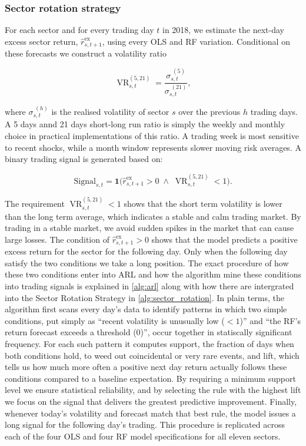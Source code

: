 \subsubsection{Sector rotation strategy}

For each sector and for every trading day $t$ in 2018, we estimate the next-day excess sector return, $\widehat{r}^{\text{ex}}_{s,t+1}$, using every OLS and RF variation. Conditional on these forecasts we construct a volatility ratio

\begin{equation}
\operatorname{VR}_{s,t}^{(5,21)}=\frac{\sigma_{s,t}^{\;(5)}}{\sigma_{s,t}^{\;(21)}},
\end{equation}

where $\sigma_{s,t}^{\;(h)}$ is the realised volatility of sector $s$ over the previous $h$ trading days. A 5 days annd 21 days short-long run ratio is simply the weekly and monthly choice in practical implementations of this ratio. A trading week is most sensitive to recent shocks, while a month window represents slower moving risk averages. A binary trading signal is generated based on:

\begin{equation}
\text{Signal}_{s,t}=\mathbf{1}
\!\bigl(
\widehat{r}^{\text{ex}}_{s,t+1}>0
\;\wedge\;
\operatorname{VR}_{s,t}^{(5,21)}<1
\bigr).
\end{equation}

The requirement $\operatorname{VR}_{s,t}^{(5,21)}<1$ shows that the short term volatility is lower than the long term average, which indicates a stable and calm trading market. By trading in a stable market, we avoid sudden spikes in the market that can cause large losses. The condition of $\widehat{r}^{\text{ex}}_{s,t+1}>0$ shows that the model predicts a positive excess return for the sector for the following day. Only when the following day satisfy the two conditions we take a long position.
The exact procedure of how these two conditions enter into ARL and how the algorithm mine these conditions into trading signals is explained in \cref{alg:arl} along with how there are intergrated into the Sector Rotation Strategy in \cref{alg:sector_rotation}. In plain terms, the algorithm first scans every day's data to identify patterns in which two simple conditions, put simply as “recent volatility is unusually low ($<1$)” and “the RF's return forecast exceeds a threshold (0)”, occur together in statiscally significant frequency. For each such pattern it computes support, the fraction of days when both conditions hold, to weed out coincidental or very rare events, and lift, which tells us how much more often a positive next day return actually follows these conditions compared to a baseline expectation. By requiring a minimum support level we ensure statistical reliability, and by selecting the rule with the highest lift we focus on the signal that delivers the greatest predictive improvement. Finally, whenever today's volatility and forecast match that best rule, the model issues a long signal for the following day's trading. This procedure is replicated across each of the four OLS and four RF model specifications for all eleven sectors.

